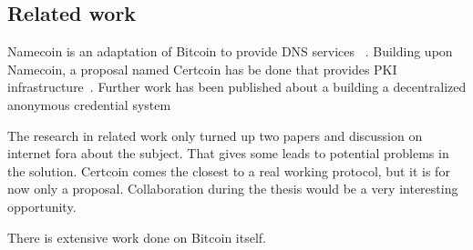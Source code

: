 \subsection*{Related work}
Namecoin is an adaptation of Bitcoin to provide DNS services ~\cite{Namecoin}.
Building upon Namecoin, a proposal named Certcoin has be done that provides PKI infrastructure~\cite{fromknecht2014certcoin}.
Further work has been published about a building a decentralized anonymous credential system~\cite{garmandecentralized}

The research in related work only turned up two papers and discussion on internet fora about the subject.
That gives some leads to potential problems in the solution.
Certcoin comes the closest to a real working protocol,
but it is for now only a proposal. 
Collaboration during the thesis would be a very interesting opportunity.

There is extensive work done on Bitcoin itself.

